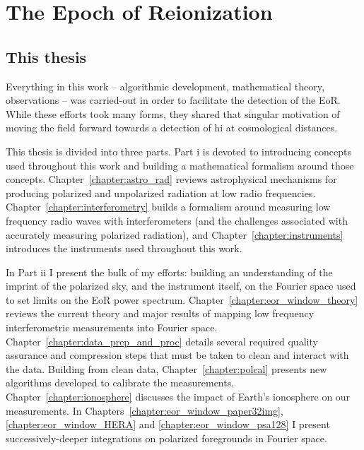 \chapter{The Epoch of Reionization}
\label{chapter:eor_intro}





\section{This thesis}

Everything in this work -- algorithmic development, mathematical theory, observations -- was carried-out in order to facilitate the detection of the EoR. While these efforts took many forms, they shared that singular motivation of moving the field forward towards a detection of {\sc hi} at cosmological distances. 

This thesis is divided into three parts. Part {\sc i} is devoted to introducing concepts used throughout this work and building a mathematical formalism around those concepts. 
Chapter~\ref{chapter:astro_rad} reviews astrophysical mechanisms for producing polarized and unpolarized radiation at low radio frequencies. 
Chapter~\ref{chapter:interferometry} builds a formalism around measuring low frequency radio waves with interferometers (and the challenges associated with accurately measuring polarized radiation), and Chapter~\ref{chapter:instruments} introduces the instruments used throughout this work.

In Part {\sc ii} I present the bulk of my efforts: building an understanding of the imprint of the polarized sky, and the instrument itself, on the Fourier space used to set limits on the EoR power spectrum. 
Chapter~\ref{chapter:eor_window_theory} reviews the current theory and major results of mapping low frequency interferometric measurements into Fourier space. 
Chapter~\ref{chapter:data_prep_and_proc} details several required quality assurance and compression steps that must be taken to clean and interact with the data. Building from clean data, Chapter~\ref{chapter:polcal} presents new algorithms developed to calibrate the measurements.
Chapter~\ref{chapter:ionosphere} discusses the impact of Earth's ionosphere on our measurements.
In Chapters~\ref{chapter:eor_window_paper32img}, \ref{chapter:eor_window_HERA} and \ref{chapter:eor_window_psa128} I present successively-deeper integrations on polarized foregrounds in Fourier space.

